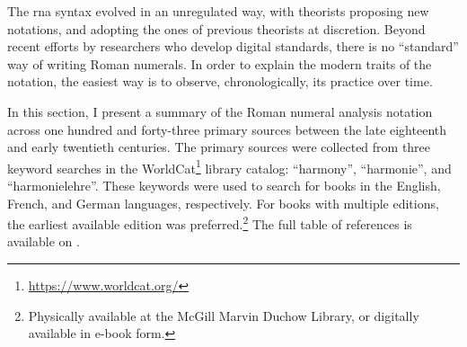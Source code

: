

The \gls{rna} syntax evolved in an unregulated way, with
theorists proposing new notations, and adopting the ones of
previous theorists at discretion. Beyond recent efforts by
researchers who develop digital standards, there is no
``standard'' way of writing Roman numerals. In order to
explain the modern traits of the notation, the easiest way
is to observe, chronologically, its practice over time.

In this section, I present a summary of the Roman numeral
analysis notation across one hundred and forty-three primary
sources between the late eighteenth and early twentieth
centuries. The primary sources were collected from three
keyword searches in the
WorldCat\footnote{\href{https://www.worldcat.org/}{https://www.worldcat.org/}}
library catalog: ``harmony'', ``harmonie'', and
``harmonielehre''. These keywords were used to search for
books in the English, French, and German languages,
respectively. For books with multiple editions, the earliest
available edition was preferred.\footnote{Physically
available at the McGill Marvin Duchow Library, or digitally
available in e-book form.} The full table of references is
available on .



